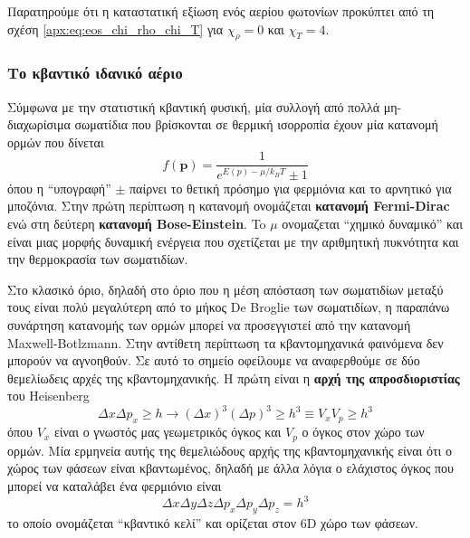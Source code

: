 Παρατηρούμε ότι η καταστατική εξίωση ενός αερίου φωτονίων προκύπτει από τη σχέση \eqref{apx:eq:eos_chi_rho_chi_T} για $\chi_\rho = 0$ και $\chi_T = 4$.



\subsubsection{Το κβαντικό ιδανικό αέριο}
Σύμφωνα με την στατιστική κβαντική φυσική, μία συλλογή από πολλά μη-διαχωρίσιμα σωματίδια που βρίσκονται σε θερμική ισορροπία έχουν μία κατανομή ορμών που δίνεται 
\begin{equation}
    \label{apx:eq:fermi_distrbution}
    f(\boldsymbol{p}) = \frac{1}{e^{E(p) - \mu / k_B T} \pm 1}
\end{equation}
όπου η ``υπογραφή'' $\pm$ παίρνει το θετική πρόσημο για φερμιόνια και το αρνητικό για μποζόνια. Στην πρώτη περίπτωση η κατανομή ονομάζεται \textbf{κατανομή Fermi-Dirac} ενώ στη δεύτερη \textbf{κατανομή Bose-Einstein}. To $\mu$ ονομαζεται ``χημικό δυναμικό'' και είναι μιας μορφής δυναμική ενέργεια που σχετίζεται με την αριθμητική πυκνότητα και την θερμοκρασία των σωματιδίων.

Στο κλασικό όριο, δηλαδή στο όριο που η μέση απόσταση των σωματιδίων μεταξύ τους είναι πολύ μεγαλύτερη από το μήκος De Broglie των σωματιδίων, η παραπάνω συνάρτηση κατανομής των ορμών μπορεί να προσεγγιστεί από την κατανομή Maxwell-Botlzmann. Στην αντίθετη περίπτωση τα κβαντομηχανικά φαινόμενα δεν μπορούν να αγνοηθούν. Σε αυτό το σημείο οφείλουμε να αναφερθούμε σε δύο θεμελίωδεις αρχές της κβαντομηχανικής. Η πρώτη είναι η \textbf{αρχή της απροσδιοριστίας} του Heisenberg
\begin{equation}
    \label{apx:eq:heisenberg_principle_1d}
    \Delta x \Delta p_x \geq h \longrightarrow (\Delta x)^3 (\Delta p)^3 \geq h^3 \equiv V_x V_p \geq h^3
\end{equation}
όπου $V_x$ είναι ο γνωστός μας γεωμετρικός όγκος και $V_p$ ο όγκος στον χώρο των ορμών. Μία ερμηνεία αυτής της θεμελιώδους αρχής της κβαντομηχανικής είναι ότι ο χώρος των φάσεων είναι κβαντωμένος, δηλαδή με άλλα λόγια ο ελάχιστος όγκος που μπορεί να καταλάβει ένα φερμιόνιο είναι 
$$\Delta x \Delta y \Delta z \Delta p_x \Delta p_y \Delta p_z = h^3$$
το οποίο ονομάζεται ``κβαντικό κελί'' και ορίζεται στον 6D χώρο των φάσεων.

